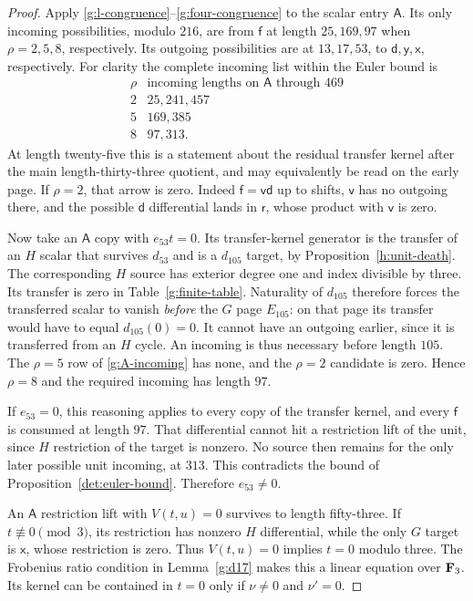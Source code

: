 \begin{proof}
Apply \eqref{g:l-congruence}--\eqref{g:four-congruence}
to the scalar entry $\mathsf A$.  Its only incoming
possibilities, modulo $216$, are from $\mathsf f$ at
length $25,169,97$ when $\rho=2,5,8$, respectively.
Its outgoing possibilities are at $13,17,53$, to
$\mathsf d,\mathsf y,\mathsf x$, respectively.
For clarity the complete incoming list within the Euler
bound is
\begin{equation}\label{g:A-incoming}
\begin{array}{c|l}
 \rho&\text{incoming lengths on }\mathsf A\text{ through }469\\\hline
 2&25,241,457\\
 5&169,385\\
 8&97,313.
\end{array}
\end{equation}
At length twenty-five this is a statement about the
residual transfer kernel after the main length-thirty-three
quotient, and may equivalently be read on the early page.
If $\rho=2$, that arrow is zero.  Indeed
$\mathsf f=\mathsf v\mathsf d$ up to shifts,
$\mathsf v$ has no outgoing there, and the possible
$\mathsf d$ differential lands in $\mathsf r$,
whose product with $\mathsf v$ is zero.

Now take an $\mathsf A$ copy with $e_{53}t=0$.
Its transfer-kernel generator is the transfer of an
$H$ scalar that survives $d_{53}$ and is a
$d_{105}$ target, by Proposition~\ref{h:unit-death}.
The corresponding $H$ source has exterior degree one
and index divisible by three.  Its transfer is zero
in Table~\ref{g:finite-table}.  Naturality of $d_{105}$
therefore forces the transferred scalar to vanish
\emph{before} the $G$ page $E_{105}$: on that page its
transfer would have to equal $d_{105}(0)=0$.
It cannot have an outgoing earlier, since it is
transferred from an $H$ cycle.  An incoming is thus
necessary before length $105$.  The $\rho=5$ row of
\eqref{g:A-incoming} has none, and the $\rho=2$
candidate is zero.  Hence $\rho=8$ and the required
incoming has length $97$.

If $e_{53}=0$, this reasoning applies to every copy of
the transfer kernel, and every $\mathsf f$ is consumed
at length $97$.  That differential cannot hit a
restriction lift of the unit, since $H$ restriction of
the target is nonzero.  No source then remains for the
only later possible unit incoming, at $313$.
This contradicts the bound of Proposition~\ref{det:euler-bound}.
Therefore $e_{53}\ne0$.

An $\mathsf A$ restriction lift with $V(t,u)=0$
survives to length fifty-three.  If $t\not\equiv0\pmod3$,
its restriction has nonzero $H$ differential, while the
only $G$ target is $\mathsf x$, whose restriction is
zero.  Thus $V(t,u)=0$ implies $t=0$ modulo three.
The Frobenius ratio condition in Lemma~\ref{g:d17}
makes this a linear equation over $\mathbf F_3$.  Its kernel
can be contained in $t=0$ only if $\nu\ne0$ and
$\nu'=0$.
\end{proof}

